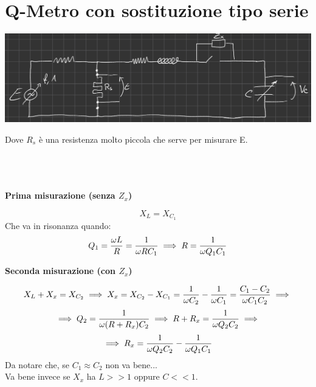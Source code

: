 \section{Q-Metro con sostituzione tipo serie}
\begin{center}
    \includegraphics[width=\textwidth]{Images/figure24.png}
\end{center}
Dove $R_s$ è una resistenza molto piccola che serve per misurare E.\\ \\ \\ \\
\begin{center}
    \textbf{Prima misurazione (senza $Z_x$)}
\end{center}
\begin{equation*}
    X_L = X_{C_1} 
\end{equation*}
Che va in risonanza quando:
\begin{equation*}
    Q_1 = \frac{\omega L}{R} = \frac{1}{\omega R C_1} \implies R = \frac{1}{\omega Q_1 C_1}
\end{equation*}
\begin{center}
    \textbf{Seconda misurazione (con $Z_x$)}
\end{center}
\begin{equation*}
    X_L + X_x = X_{C_2} \implies X_x = X_{C_2} - X_{C_1} = \frac{1}{\omega C_2} - \frac{1}{\omega C_1} = \frac{C_1 - C_2}{\omega C_1 C_2} \implies
\end{equation*}
\begin{equation*}
    \implies Q_2 = \frac{1}{\omega (R + R_x) C_2} \implies R+ R_x = \frac{1}{\omega Q_2 C_2} \implies
\end{equation*}
\begin{equation*}
    \implies R_x = \frac{1}{\omega Q_2 C_2} - \frac{1}{\omega Q_1 C_1}
\end{equation*}
Da notare che, se $C_1 \approx C_2$ non va bene...\\
Va bene invece se $X_x$ ha $L >> 1$ oppure $C << 1$.